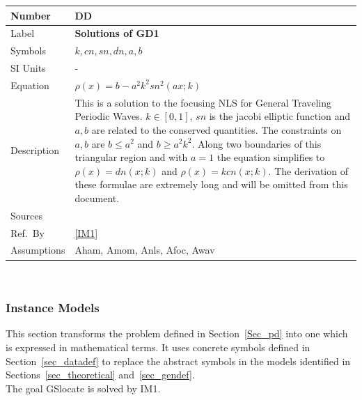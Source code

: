 \documentclass[12pt]{article}
\newcommand{\colAwidth}{0.13\textwidth}
\newcommand{\colBwidth}{0.82\textwidth}
\newcounter{defnum} %
\newcounter{datadefnum} %
\begin{document}
\noindent
\begin{minipage}{\textwidth} \label{DD2}
	\renewcommand*{\arraystretch}{1.5}
	\begin{tabular}{| p{\colAwidth} | p{\colBwidth}|}
		\hline
		\rowcolor[gray]{0.9}
		Number& DD{datadefnum}\thedatadefnum \label{FluxCoil}\\
		\hline
		Label& \bf Solutions of GD1\\
		\hline
		Symbols &$k, cn, sn, dn,a,b$\\
		\hline
		SI Units & -\\
		\hline
		Equation &$ \rho(x) = b - a^{2}k^{2}sn^{2}(ax;k)$\\
		\hline
		Description & 
		This is a solution to the focusing NLS for 
		General Traveling Periodic Waves. $k\in [0,1]$, $sn$ is the jacobi 
		elliptic function and $a,b$ are related to the conserved quantities. 
		The constraints on $a,b$ are $b \leq a^{2}$ and $b \geq a^{2}k^{2}$. 
		Along two boundaries of this triangular region and with $a=1$ the 
		equation simplifies to $ \rho(x) = dn(x;k) $ and $ \rho(x) = kcn(x;k)$.
		The derivation of these formulae are extremely long and will be omitted 
		from this document.  
		\\
		\hline
		Sources& \cite{SegaletAl} \\
		\hline
		Ref.\ By & \ref{IM1}\\
		\hline 
		Assumptions & Aham, Amom, Anls, Afoc, Awav \\
		\hline 
	\end{tabular}\\
\end{minipage} 

\subsubsection{Instance Models} \label{sec_instance}    

This section transforms the problem defined in Section~\ref{Sec_pd} into 
one which is expressed in mathematical terms. It uses concrete symbols defined 
in Section~\ref{sec_datadef} to replace the abstract symbols in the models 
identified in Sections~\ref{sec_theoretical} and~\ref{sec_gendef}. \\

The goal GSlocate is solved by IM1.  

\end{document}
